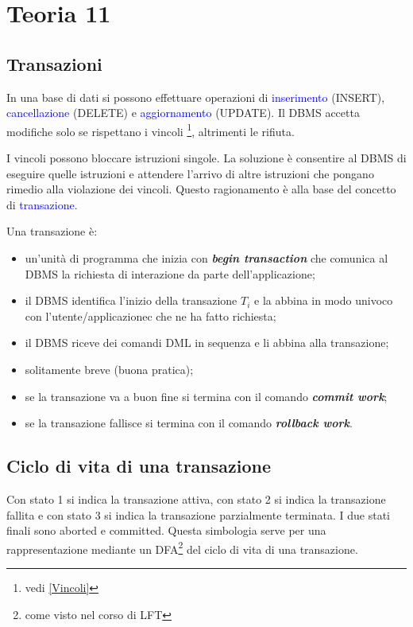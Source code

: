 \chapter{Teoria 11}

\section{Transazioni}

\label{Transazioni}

In una base di dati si possono effettuare operazioni di \textcolor{blue}{inserimento} (INSERT), \textcolor{blue}{cancellazione} (DELETE) e \textcolor{blue}{aggiornamento} (UPDATE). Il DBMS accetta modifiche solo se rispettano i vincoli \footnote{vedi \ref{Vincoli}}, altrimenti le rifiuta. 

I vincoli possono bloccare istruzioni singole. La soluzione è consentire al DBMS di eseguire quelle istruzioni e attendere l'arrivo di altre istruzioni che pongano rimedio alla violazione dei vincoli. Questo ragionamento è alla base del concetto di \textcolor{blue}{transazione}. 

Una transazione è: 
\begin{itemize}
    \item un'unità di programma che inizia con \textbf{\textit{begin transaction}} che comunica al DBMS la richiesta di interazione da parte dell'applicazione;
    \item il DBMS identifica l'inizio della transazione $T_i$ e la abbina in modo univoco con l'utente/applicazionec che ne ha fatto richiesta;
    \item il DBMS riceve dei comandi DML in sequenza e li abbina alla transazione;
    \item solitamente breve (buona pratica);
    \item se la transazione va a buon fine si termina con il comando \textbf{\textit{commit work}};
    \item se la transazione fallisce si termina con il comando \textbf{\textit{rollback work}}.
\end{itemize}

\section{Ciclo di vita di una transazione}

Con stato 1 si indica la transazione attiva, con stato 2 si indica la transazione fallita e con stato 3 si indica la transazione parzialmente terminata. I due stati finali sono aborted e committed. Questa simbologia serve per una rappresentazione mediante un DFA\footnote{come visto nel corso di LFT} del ciclo di vita di una transazione.

